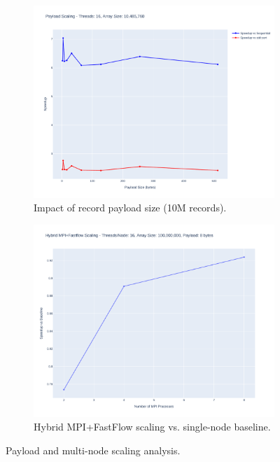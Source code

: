 \documentclass[10pt]{article}
\begin{document}
\begin{figure}[H]
    \centering
    \begin{subfigure}{0.49\textwidth}
        \includegraphics[width=\linewidth]{../python/plots/payload_scaling.pdf}
        \caption{Impact of record payload size (10M records).}
        \label{fig:payload_scaling}
    \end{subfigure}
    \hfill
    \begin{subfigure}{0.49\textwidth}
        \includegraphics[width=\linewidth]{../python/plots/cluster_scaling.pdf}
        \caption{Hybrid MPI+FastFlow scaling vs. single-node baseline.}
        \label{fig:cluster_scaling}
    \end{subfigure}
    \caption{Payload and multi-node scaling analysis.}
    \label{fig:scaling_cluster}
\end{figure}
\end{document}
